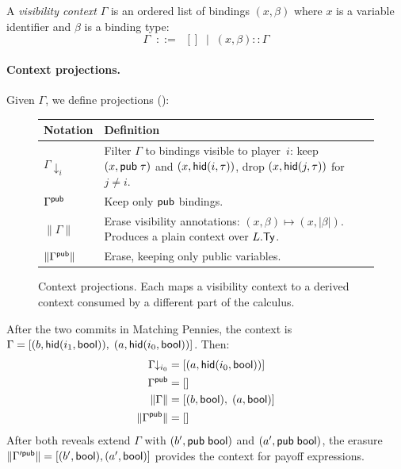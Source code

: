 \documentclass[11pt]{article}
\begin{document}
\begin{definition}
A \emph{visibility context} $\Gamma$ is an ordered list of bindings
$(x, \beta)$ where $x$ is a variable identifier and $\beta$ is a binding type:
\[
  \Gamma \;\;::=\;\; [] \;\mid\; (x, \beta) :: \Gamma
\]
\end{definition}

\paragraph{Context projections.}
Given $\Gamma$, we define projections ():

\begin{figure}[ht]
\centering
\renewcommand{\arraystretch}{1.3}
\begin{tabular}{@{}lp{7.5cm}@{}}
\toprule
Notation & Definition \\
\midrule
$\Gamma\!\!\downarrow_i$ &
  Filter $\Gamma$ to bindings visible to player~$i$: keep $(x, \mathsf{pub}\;\tau)$
  and $(x, \mathsf{hid}(i, \tau))$, drop $(x, \mathsf{hid}(j, \tau))$ for $j \ne i$. \\
$\Gamma^{\mathsf{pub}}$ &
  Keep only $\mathsf{pub}$ bindings. \\
$\|\Gamma\|$ &
  Erase visibility annotations: $(x, \beta) \mapsto (x, |\beta|)$.
  Produces a plain context over $L.\mathsf{Ty}$. \\
$\|\Gamma^{\mathsf{pub}}\|$ &
  Erase, keeping only public variables. \\
\bottomrule
\end{tabular}
\caption{Context projections. Each maps a visibility context to a derived
context consumed by a different part of the calculus.}\label{fig:projections}
\end{figure}

\begin{example}\label{ex:projections}
After the two commits in Matching Pennies, the context is
$\Gamma = [(b, \mathsf{hid}(i_{1}, \mathsf{bool})),\; (a, \mathsf{hid}(i_{0}, \mathsf{bool}))]$.
Then:
\begin{align*}
  \Gamma\!\!\downarrow_{i_{0}}
    &= [(a, \mathsf{hid}(i_{0}, \mathsf{bool}))] \\
  \Gamma^{\mathsf{pub}}
    &= [] \\
  \|\Gamma\|
    &= [(b, \mathsf{bool}),\; (a, \mathsf{bool})] \\
  \|\Gamma^{\mathsf{pub}}\|
    &= []
\end{align*}
After both reveals extend $\Gamma$ with $(b', \mathsf{pub}\;\mathsf{bool})$ and
$(a', \mathsf{pub}\;\mathsf{bool})$, the erasure $\|\Gamma'^{\mathsf{pub}}\| = [(b', \mathsf{bool}), (a', \mathsf{bool})]$
provides the context for payoff expressions.
\end{example}
\end{document}
